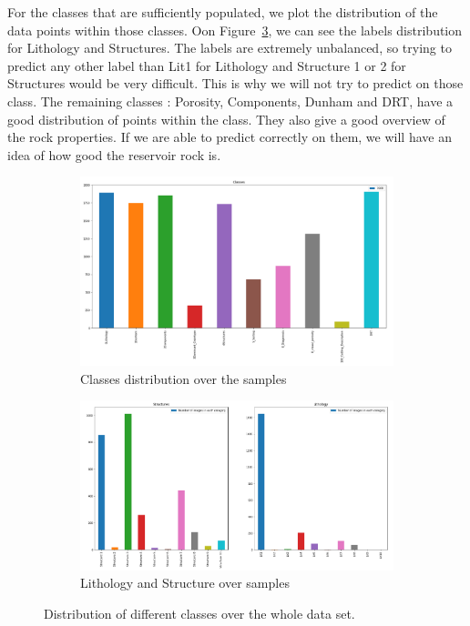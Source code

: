  For the classes that are sufficiently populated, we plot the distribution of the data points within those classes. Oon Figure~\ref{fig:litandstruct}, we can see the labels distribution for Lithology and Structures. The labels are extremely unbalanced, so trying to predict any other label than Lit1 for Lithology and Structure 1 or 2 for Structures would be very difficult. This is why we will not try to predict on those class. 
 The remaining classes : Porosity, Components, Dunham and DRT, have a good distribution of points within the class. They also give a good overview of the rock properties. If we are able to predict correctly on them, we will have an idea of how good the reservoir rock is. 
\begin{figure}
\begin{subfigure}{.5\textwidth}
  \centering
  \includegraphics[width=.8\linewidth]{figures/03-classes.png}
  \caption{Classes distribution over the samples}
  \label{fig:classes}
\end{subfigure}%
\begin{subfigure}{.5\textwidth}
  \centering
  \includegraphics[width=.8\linewidth]{figures/03-boob.PNG}
  \caption{Lithology and Structure over samples}
  \label{fig:litandstruct}
\end{subfigure}
\caption[Classes distributions]{Distribution of different classes over the whole data set.}
\end{figure}

